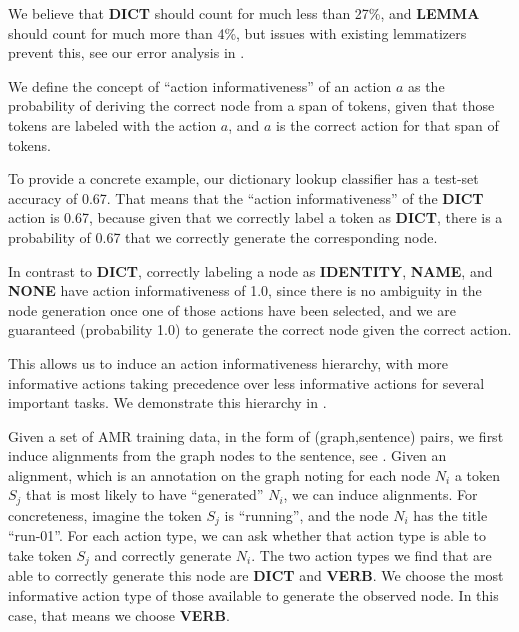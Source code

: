 \documentclass[11pt]{article}
\begin{document}
We believe that \textbf{DICT} should count for much less than 27\%, and \textbf{LEMMA} should count for much more than 4\%, but issues with existing lemmatizers prevent this, see our error analysis in .


We define the concept of ``action informativeness'' of an action $a$ as the probability of deriving the correct node from a span of tokens, given that those tokens are labeled with the action $a$, and $a$ is the correct action for that span of tokens.

To provide a concrete example, our dictionary lookup classifier has a test-set accuracy of 0.67. That means that the ``action informativeness'' of the \textbf{DICT} action is 0.67, because given that we correctly label a token as \textbf{DICT}, there is a probability of 0.67 that we correctly generate the corresponding node.

In contrast to \textbf{DICT}, correctly labeling a node as \textbf{IDENTITY}, \textbf{NAME}, and \textbf{NONE} have action informativeness of 1.0, since there is no ambiguity in the node generation once one of those actions have been selected, and we are guaranteed (probability 1.0) to generate the correct node given the correct action.


This allows us to induce an action informativeness hierarchy, with more informative actions taking precedence over less informative actions for several important tasks. We demonstrate this hierarchy in .


Given a set of AMR training data, in the form of (graph,sentence) pairs, we first induce alignments from the graph nodes to the sentence, see . Given an alignment, which is an annotation on the graph noting for each node $N_i$ a token $S_j$ that is most likely to have ``generated'' $N_i$, we can induce alignments. For concreteness, imagine the token $S_j$ is ``running'', and the node $N_i$ has the title ``run-01''. For each action type, we can ask whether that action type is able to take token $S_j$ and correctly generate $N_i$. The two action types we find that are able to correctly generate this node are \textbf{DICT} and \textbf{VERB}. We choose the most informative action type of those available to generate the observed node. In this case, that means we choose \textbf{VERB}.
\end{document}
